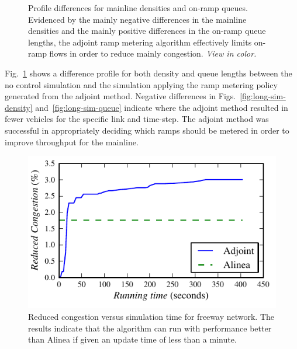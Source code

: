 \begin{figure}[h]
\centering%
\hfill%
%
\caption{Profile differences for mainline densities and on-ramp queues. Evidenced
	by the mainly negative differences in the mainline densities and the
	mainly positive differences in the on-ramp queue lengths, the adjoint
	ramp metering algorithm effectively limits on-ramp flows in order to
	reduce mainly congestion. \textit{View in color.}\label{fig:long-sim}}
\end{figure}			

Fig.~\ref{fig:long-sim} shows a difference profile for both density and queue lengths between the
no control simulation and the simulation applying the ramp metering
policy generated from the adjoint method. Negative differences in
Figs.~\ref{fig:long-sim-density} and~\ref{fig:long-sim-queue}
indicate where the adjoint method resulted in fewer vehicles for the
specific link and time-step. The adjoint method was successful in
appropriately deciding which ramps should be metered in order to improve
throughput for the mainline.

\begin{figure}[h]
\centering%
\includegraphics[width=0.45\columnwidth]{previous-articles/adjoint/images/longsim}%
\caption{Reduced congestion versus simulation time for freeway network. The results indicate that the algorithm can run with performance better than Alinea if given an update time of less than a minute.}%
\label{fig:running-time}%
\end{figure}
								
